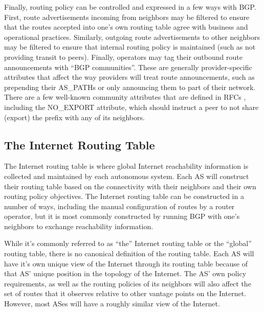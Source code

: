 Finally, routing policy can be controlled and expressed in a few ways with BGP. First, route advertisements incoming from neighbors may be filtered to ensure that the routes accepted into one's own routing table agree with business and operational practices. Similarly, outgoing route advertisements to other neighbors may be filtered to ensure that internal routing policy is maintained (such as not providing transit to peers). Finally, operators may tag their outbound route announcements with ``BGP communities''. These are generally provider-specific attributes that affect the way providers will treat route announcements, such as prepending their AS\_PATHs or only announcing them to part of their network. There are a few well-known community attributes that are defined in RFCs \cite{rfc1997}, including the NO\_EXPORT attribute, which should instruct a peer to not share (export) the prefix with any of its neighbors.

\subsection{The Internet Routing Table}

The Internet routing table is where global Internet reachability information is collected and maintained by each autonomous system. Each AS will construct their routing table based on the connectivity with their neighbors and their own routing policy objectives. The Internet routing table can be constructed in a number of ways, including the manual configuration of routes by a router operator, but it is most commonly constructed by running BGP with one's neighbors to exchange reachability information.

While it's commonly referred to as ``the'' Internet routing table or the ``global'' routing table, there is no canonical definition of the routing table. Each AS will have it's own unique view of the Internet through its routing table because of that AS' unique position in the topology of the Internet. The AS' own policy requirements, as well as the routing policies of its neighbors will also affect the set of routes that it observes relative to other vantage points on the Internet. However, most ASes will have a roughly similar view of the Internet.

